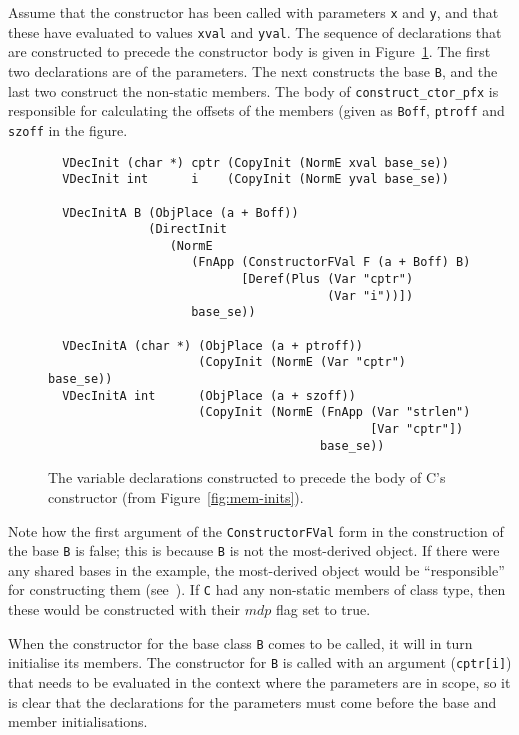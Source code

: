 \documentclass[11pt]{article}
\begin{document}
Assume that the constructor has been called with parameters \texttt{x}
and \texttt{y}, and that these have evaluated to values \texttt{xval}
and \texttt{yval}. The sequence of declarations that are constructed
to precede the constructor body is given in
Figure~\ref{fig:constructor-vdecs}. The first two declarations are of
the parameters.  The next constructs the base \texttt{B}, and the last
two construct the non-static members.  The body of
\texttt{construct_ctor_pfx} is responsible for calculating the offsets
of the members (given as \texttt{Boff}, \texttt{ptroff} and
\texttt{szoff} in the figure.

\begin{figure}[hbtp]
\begin{verbatim}
  VDecInit (char *) cptr (CopyInit (NormE xval base_se))
  VDecInit int      i    (CopyInit (NormE yval base_se))

  VDecInitA B (ObjPlace (a + Boff))
              (DirectInit
                 (NormE
                    (FnApp (ConstructorFVal F (a + Boff) B)
                           [Deref(Plus (Var "cptr")
                                       (Var "i"))])
                    base_se))

  VDecInitA (char *) (ObjPlace (a + ptroff))
                     (CopyInit (NormE (Var "cptr") base_se))
  VDecInitA int      (ObjPlace (a + szoff))
                     (CopyInit (NormE (FnApp (Var "strlen")
                                             [Var "cptr"])
                                      base_se))
\end{verbatim}
\caption{The variable declarations constructed to precede the body of
  C's constructor (from Figure~\ref{fig:mem-inits}).}
\label{fig:constructor-vdecs}
\end{figure}

Note how the first argument of the \texttt{ConstructorFVal} form in
the construction of the base \texttt{B} is false; this is because
\texttt{B} is not the most-derived object.  If there were any shared
bases in the example, the most-derived object would be ``responsible''
for constructing them (see~\cite[\S12.6.2, paragraph
5]{cpp-standard-iso14882}).  If \texttt{C} had any non-static members
of class type, then these would be constructed with their
$\mathit{mdp}$ flag set to true.

When the constructor for the base class \texttt{B} comes to be called,
it will in turn initialise its members.  The constructor for
\texttt{B} is called with an argument (\texttt{cptr[i]}) that needs to
be evaluated in the context where the parameters are in scope, so it
is clear that the declarations for the parameters must come before the
base and member initialisations.
\end{document}
